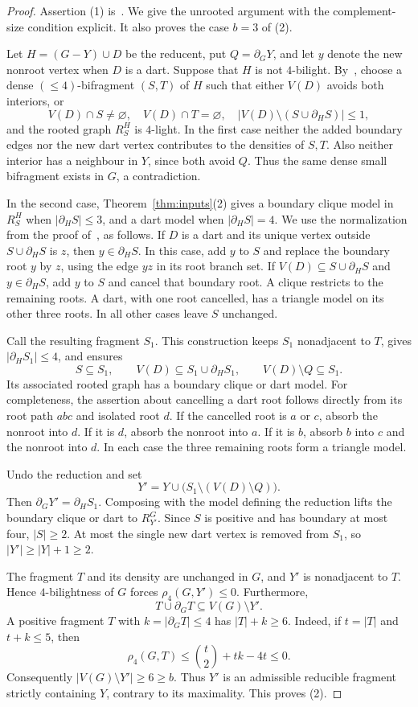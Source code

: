 \documentclass[11pt]{article}
\theoremstyle{remark}
\numberwithin{equation}{section}
\newcommand{\dd}{\partial}
\begin{document}
\begin{proof}
Assertion (1) is~\cite[Lemma~3.3]{DNR26}. We give the unrooted argument with the complement-size condition explicit. It also proves the case $b=3$ of (2).

Let $H=(G-Y)\cup D$ be the reducent, put $Q=\dd_GY$, and let $y$ denote the new nonroot vertex when $D$ is a dart. Suppose that $H$ is not $4$-bilight. By~\cite[Lemma~3.2]{DNR26}, choose a dense $(\le4)$-bifragment $(S,T)$ of $H$ such that either $V(D)$ avoids both interiors, or
\[
V(D)\cap S\ne\varnothing,\quad V(D)\cap T=\varnothing,\quad
|V(D)\setminus(S\cup\dd_HS)|\le1,
\]
and the rooted graph $R^H_S$ is $4$-light. In the first case neither the added boundary edges nor the new dart vertex contributes to the densities of $S,T$. Also neither interior has a neighbour in $Y$, since both avoid $Q$. Thus the same dense small bifragment exists in $G$, a contradiction.

In the second case, Theorem~\ref{thm:inputs}(2) gives a boundary clique model in $R^H_S$ when $|\dd_HS|\le3$, and a dart model when $|\dd_HS|=4$. We use the normalization from the proof of~\cite[Lemma~3.3]{DNR26}, as follows. If $D$ is a dart and its unique vertex outside $S\cup\dd_HS$ is $z$, then $y\in\dd_HS$. In this case, add $y$ to $S$ and replace the boundary root $y$ by $z$, using the edge $yz$ in its root branch set. If $V(D)\subseteq S\cup\dd_HS$ and $y\in\dd_HS$, add $y$ to $S$ and cancel that boundary root. A clique restricts to the remaining roots. A dart, with one root cancelled, has a triangle model on its other three roots. In all other cases leave $S$ unchanged.

Call the resulting fragment $S_1$. This construction keeps $S_1$ nonadjacent to $T$, gives $|\dd_HS_1|\le4$, and ensures
\[
S\subseteq S_1,\qquad V(D)\subseteq S_1\cup\dd_HS_1,\qquad
V(D)\setminus Q\subseteq S_1.
\]
Its associated rooted graph has a boundary clique or dart model. For completeness, the assertion about cancelling a dart root follows directly from its root path $abc$ and isolated root $d$. If the cancelled root is $a$ or $c$, absorb the nonroot into $d$. If it is $d$, absorb the nonroot into $a$. If it is $b$, absorb $b$ into $c$ and the nonroot into $d$. In each case the three remaining roots form a triangle model.

Undo the reduction and set
\[
Y'=Y\cup\bigl(S_1\setminus(V(D)\setminus Q)\bigr).
\]
Then $\dd_GY'=\dd_HS_1$. Composing with the model defining the reduction lifts the boundary clique or dart to $R^G_{Y'}$. Since $S$ is positive and has boundary at most four, $|S|\ge2$. At most the single new dart vertex is removed from $S_1$, so $|Y'|\ge|Y|+1\ge2$.

The fragment $T$ and its density are unchanged in $G$, and $Y'$ is nonadjacent to $T$. Hence $4$-bilightness of $G$ forces $\rho_4(G,Y')\le0$. Furthermore,
\[
T\cup\dd_GT\subseteq V(G)\setminus Y'.
\]
A positive fragment $T$ with $k=|\dd_GT|\le4$ has $|T|+k\ge6$. Indeed, if $t=|T|$ and $t+k\le5$, then
\[
\rho_4(G,T)\le\binom{t}{2}+tk-4t\le0.
\]
Consequently $|V(G)\setminus Y'|\ge6\ge b$. Thus $Y'$ is an admissible reducible fragment strictly containing $Y$, contrary to its maximality. This proves (2).
\end{proof}
\end{document}
